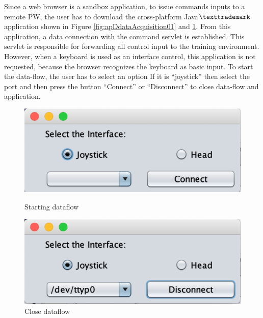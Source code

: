 Since a web browser is a sandbox application, to issue commands inputs to a remote PW, the user has to download the cross-platform Java$\texttrademark$ application shown in Figure \ref{fig:apDdataAcquisition01} and \ref{fig:apDdataAcquisition02}. From this application, a data connection with the command servlet is established. This servlet is responsible for forwarding all control input to the training environment. However, when a keyboard is used as an interface control, this application is not requested, because the browser recognizes the keyboard as basic input.  To start the data-flow, the user has to select an option If it is ``joystick''  then select the port and then press the button ``Connect''  or ``Disconnect'' to close data-flow and application. 

\begin{figure}[!htbp]
\center
\begin{minipage}{0.45\linewidth}
\center
\captionsetup{justification=centering,margin=0.5cm,font=tiny}
\includegraphics[width=1\linewidth]{img/apendiceD/dataAcquisition01}
\caption{Starting dataflow} \label{fig:apDdataAcquisition01}
\end{minipage}
\begin{minipage}{0.45\linewidth}
\center
\captionsetup{justification=centering,margin=0cm,font=tiny}
\includegraphics[width=1\linewidth]{img/apendiceD/dataAcquisition02}
\caption{Close dataflow} \label{fig:apDdataAcquisition02}
\end{minipage}
\end{figure}


